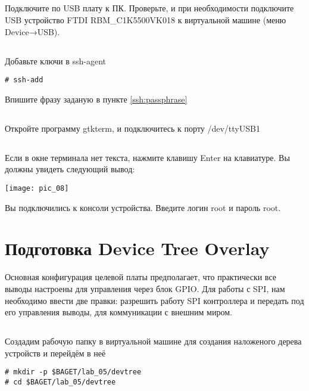 \subsection{}Подключите по USB плату к ПК. Проверьте, и при необходимости подключите USB устройство FTDI RBM\_C1K5500VK018 к виртуальной машине (меню Device→USB).

\subsection{}Добавьте ключи в ssh-agent
\begin{lstlisting}[style=bash]
	# ssh-add
\end{lstlisting}
Впишите фразу заданую в пункте \ref{ssh:passphrase}

\subsection{}Откройте программу gtkterm, и подключитесь к порту /dev/ttyUSB1

\subsection{}Если в окне терминала нет текста, нажмите клавишу Enter на клавиатуре. Вы должны увидеть следующий вывод:
\begin{center}
	\texttt{[image: pic\_08]}
\end{center}
Вы подключились к консоли устройства. Введите логин root и пароль root.


\section{Подготовка Device Tree Overlay}
Основная конфигурация целевой платы предполагает, что практически все выводы настроены для управления через блок GPIO. Для работы с SPI, нам необходимо ввести две правки: разрешить работу SPI контроллера и передать под его управления выводы, для коммуникации с внешним миром. 

\subsection{} Создадим рабочую папку в виртуальной машине для создания наложеного дерева устройств и перейдём в неё 
\begin{lstlisting}[style=bash]
# mkdir -p $BAGET/lab_05/devtree
# cd $BAGET/lab_05/devtree
\end{lstlisting}

